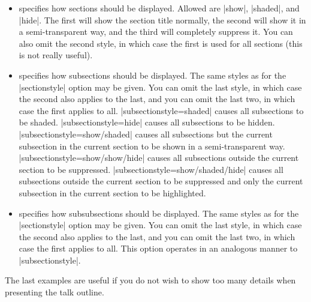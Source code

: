 \begin{command}{\tableofcontents{}}
\begin{itemize}
  \item
     specifies how sections should be displayed. Allowed  are |show|, |shaded|, and |hide|. The first will show the section title normally, the second will show it in a semi-transparent way, and the third will completely suppress it. You can also omit the second style, in which case the first is used for all sections (this is not really useful).
  \item
     specifies how subsections should be displayed. The same styles as for the |sectionstyle| option may be given. You can omit the last style, in which case the second also applies to the last, and you can omit the last two, in which case the first applies to all.
    \example
    |subsectionstyle=shaded| causes all subsections to be shaded.
    \example
    |subsectionstyle=hide| causes all subsections to be hidden.
    \example
    |subsectionstyle=show/shaded| causes all subsections but the current subsection in the current section to be shown in a semi-transparent way.
    \example
    |subsectionstyle=show/show/hide| causes all subsections outside the current section to be suppressed.
    \example
    |subsectionstyle=show/shaded/hide| causes all subsections outside the current section to be suppressed and only the current subsection in the current section to be highlighted.
  \item
     specifies how subsubsections should be displayed. The same styles as for the |sectionstyle| option may be given. You can omit the last style, in which case the second also applies to the last, and you can omit the last two, in which case the first applies to all.
    This option operates in an analogous manner to |subsectionstyle|.
  \end{itemize}

  The last examples are useful if you do not wish to show too many details when presenting the talk outline.


\end{command}
